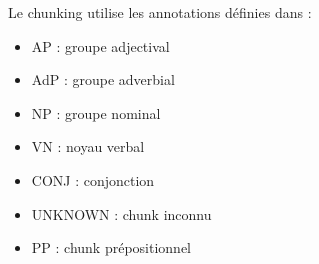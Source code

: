 \documentclass[manual-fr.tex]{subfiles}
\begin{document}
Le chunking utilise les annotations définies dans \cite{Tellier2012} :\\

\begin{minipage}{0.49\linewidth}
\begin{itemize}
	\item[] AP : groupe adjectival
	\item[] AdP : groupe adverbial
	\item[] NP : groupe nominal
	\item[] VN : noyau verbal
\end{itemize}
\end{minipage}
\begin{minipage}{0.49\linewidth}
\begin{itemize}
	\item[] CONJ : conjonction
	\item[] UNKNOWN : chunk inconnu
	\item[] PP : chunk prépositionnel
\end{itemize}
\end{minipage}
\end{document}
